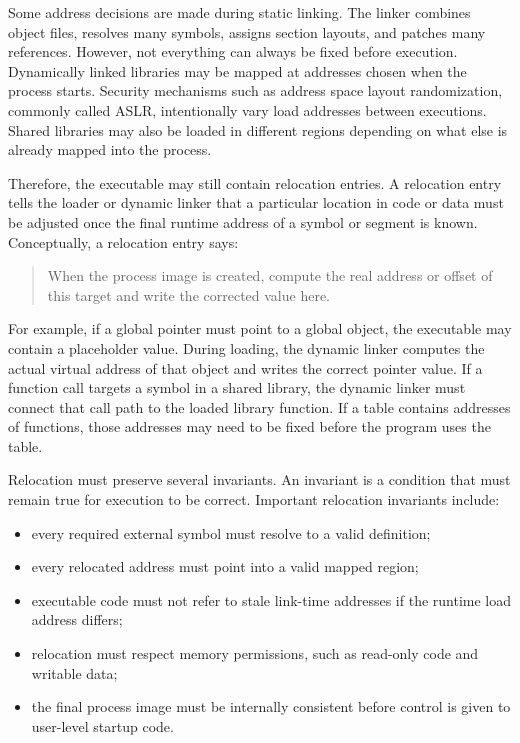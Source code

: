 Some address decisions are made during static linking. The linker combines object files, resolves many symbols, assigns section layouts, and patches many references. However, not everything can always be fixed before execution. Dynamically linked libraries may be mapped at addresses chosen when the process starts. Security mechanisms such as address space layout randomization, commonly called ASLR, intentionally vary load addresses between executions. Shared libraries may also be loaded in different regions depending on what else is already mapped into the process.

Therefore, the executable may still contain relocation entries. A relocation entry tells the loader or dynamic linker that a particular location in code or data must be adjusted once the final runtime address of a symbol or segment is known. Conceptually, a relocation entry says:

\begin{quote}
When the process image is created, compute the real address or offset of this target and write the corrected value here.
\end{quote}

For example, if a global pointer must point to a global object, the executable may contain a placeholder value. During loading, the dynamic linker computes the actual virtual address of that object and writes the correct pointer value. If a function call targets a symbol in a shared library, the dynamic linker must connect that call path to the loaded library function. If a table contains addresses of functions, those addresses may need to be fixed before the program uses the table.

Relocation must preserve several invariants. An invariant is a condition that must remain true for execution to be correct. Important relocation invariants include:

\begin{itemize}
    \item every required external symbol must resolve to a valid definition;
    \item every relocated address must point into a valid mapped region;
    \item executable code must not refer to stale link-time addresses if the runtime load address differs;
    \item relocation must respect memory permissions, such as read-only code and writable data;
    \item the final process image must be internally consistent before control is given to user-level startup code.
\end{itemize}

